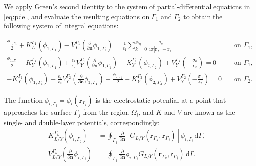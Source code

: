 

We apply Green's second identity to the system of partial-differential equations in \eqref{eq:pde}, and evaluate the resulting equations on $\Gamma_1$ and $\Gamma_2$ to obtain the following system of integral equations:
%
\begin{widetext}
\begin{align} \label{eq:integral_eq}
\frac{\phi_{1,\Gamma_1}}{2}+ K_{L}^{\Gamma_1}(\phi_{1,\Gamma_1}) -  V_{L}^{\Gamma_1} \left(\frac{\partial}{\partial \mathbf{n}}\phi_{1,\Gamma_1} \right)  =  
\frac{1}{\epsilon_1} \sum_{k=0}^{N_q} \frac{q_k}{4\pi|\mathbf{r}_{\Gamma_1} - \mathbf{r}_k|} &  \quad \text{on $\Gamma_1$,} \nonumber \\ 
\frac{\phi_{1,\Gamma_1}}{2} - K_{Y}^{\Gamma_1}(\phi_{1,\Gamma_1}) +  \frac{\epsilon_1}{\epsilon_2} V_{Y}^{\Gamma_1} \left( \frac{\partial}{\partial \mathbf{n}} \phi_{1,\Gamma_1} \right) -  
K_{Y}^{\Gamma_1}(\phi_{2,\Gamma_2})  + V_{Y}^{\Gamma_1} \left( -\frac{\sigma_0}{\epsilon_2} \right)  = 0& \quad \text{on $\Gamma_1$,} \nonumber \\ 
- K_{Y}^{\Gamma_2}(\phi_{1,\Gamma_1}) + \frac{\epsilon_1}{\epsilon_2} V_{Y}^{\Gamma_2}  \left( \frac{\partial}{\partial \mathbf{n}} \phi_{1,\Gamma_1} \right) + \frac{\phi_{2,\Gamma_2}}{2} - 
K_{Y}^{\Gamma_2}(\phi_{2,\Gamma_2}) +  V_{Y}^{\Gamma_2} \left( -\frac{\sigma_0}{\epsilon_2} \right)  = 0& \quad \text{on $\Gamma_2$.}
\end{align}
\end{widetext}


\noindent The function $\phi_{i,\Gamma_j} = \phi_i(\mathbf{r}_{\Gamma_j})$ is the electrostatic potential at a point that approaches the surface $\Gamma_j$ from the region $\Omega_i$, and
$K$ and $V$ are known as the single- and double-layer potentials, correspondingly:
%
\begin{align} \label{eq:layers}
K_{L/Y}^{\Gamma_k}(\phi_{i,\Gamma_j}) &= \oint_{\Gamma_j} \frac{\partial}{\partial \mathbf{n}} \left[ G_{L/Y}(\mathbf{r}_{\Gamma_k},\mathbf{r}_{\Gamma_j}) \right]\phi_{i,\Gamma_j} \, \mathrm{d} \Gamma, \nonumber \\
V_{L/Y}^{\Gamma_k} \left( \frac{\partial}{\partial \mathbf{n}} \phi_{i,\Gamma_j} \right) &= \oint_{\Gamma_j} \frac{\partial}{\partial \mathbf{n}} \phi_{i,\Gamma_j} G_{L/Y}(\mathbf{r}_{\Gamma_k},\mathbf{r}_{\Gamma_j})  \, \mathrm{d} \Gamma.
\end{align}

